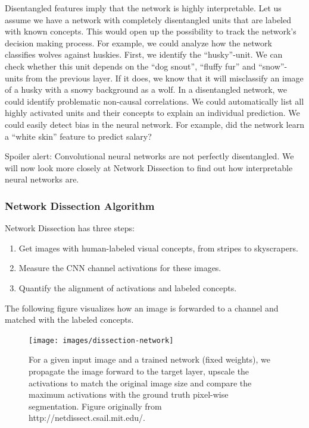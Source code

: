 \documentclass[
  10pt,
]{scrbook}
\providecommand{\tightlist}{%
  \setlength{\itemsep}{0pt}\setlength{\parskip}{0pt}}
\begin{document}
Disentangled features imply that the network is highly interpretable.
Let us assume we have a network with completely disentangled units that are labeled with known concepts.
This would open up the possibility to track the network's decision making process.
For example, we could analyze how the network classifies wolves against huskies.
First, we identify the ``husky''-unit.
We can check whether this unit depends on the ``dog snout'', ``fluffy fur'' and ``snow''-units from the previous layer.
If it does, we know that it will misclassify an image of a husky with a snowy background as a wolf.
In a disentangled network, we could identify problematic non-causal correlations.
We could automatically list all highly activated units and their concepts to explain an individual prediction.
We could easily detect bias in the neural network.
For example, did the network learn a ``white skin'' feature to predict salary?

Spoiler alert: Convolutional neural networks are not perfectly disentangled.
We will now look more closely at Network Dissection to find out how interpretable neural networks are.

\hypertarget{network-dissection-algorithm}{%
\subsubsection{Network Dissection Algorithm}\label{network-dissection-algorithm}}

Network Dissection has three steps:

\begin{enumerate}
\def\labelenumi{\arabic{enumi}.}
\tightlist
\item
  Get images with human-labeled visual concepts, from stripes to skyscrapers.
\item
  Measure the CNN channel activations for these images.
\item
  Quantify the alignment of activations and labeled concepts.
\end{enumerate}

The following figure visualizes how an image is forwarded to a channel and matched with the labeled concepts.

\begin{figure}

{\centering \texttt{[image: images/dissection-network]} 

}

\caption{For a given input image and a trained network (fixed weights), we propagate the image forward to the target layer, upscale the activations to match the original image size and compare the maximum activations with the ground truth pixel-wise segmentation. Figure originally from http://netdissect.csail.mit.edu/.}\label{fig:unnamed-chunk-54}
\end{figure}
\end{document}
